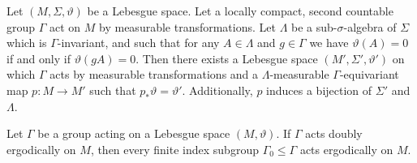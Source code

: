\begin{thm}
  \label{thm:mackey}
  Let \((M, \Sigma, \vartheta)\) be a Lebesgue space. Let a locally compact, second countable group \(\Gamma\) act on \(M\) by measurable transformations. Let \(\Lambda\) be a sub-\(\sigma\)-algebra of \(\Sigma\) which is \(\Gamma\)-invariant, and such that for any \(A \in \Lambda\) and \(g \in \Gamma\) we have \(\vartheta(A) = 0 \) if and only if \(\vartheta(gA) = 0\). Then there exists a Lebesgue space \((M', \Sigma', \vartheta')\) on which \(\Gamma\) acts by measurable transformations and a \(\Lambda\)-measurable \(\Gamma\)-equivariant map \(p \colon M \to M'\) such that \(p_\ast \vartheta = \vartheta'\). Additionally, \(p\) induces a bijection of \(\Sigma'\) and \(\Lambda\).
\end{thm}

\begin{lemma}[{\cite[Lemma 4.3]{MR3509968}}]
  Let \(\Gamma\) be a group acting on a Lebesgue space \((M, \vartheta)\). If \(\Gamma\) acts doubly ergodically  on \(M\), then every  finite index subgroup \(\Gamma_0 \leq \Gamma\) acts ergodically on \(M\).
\end{lemma}

